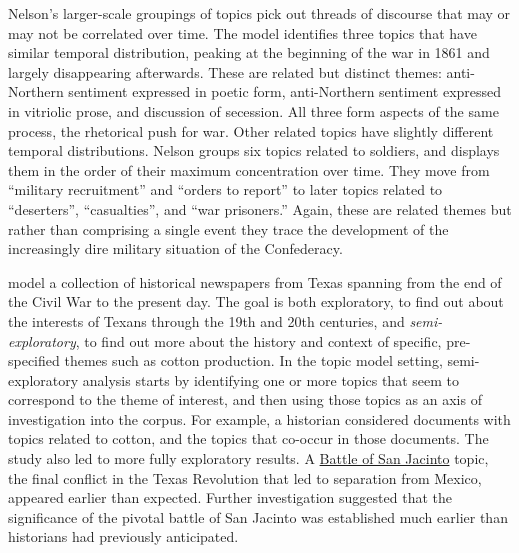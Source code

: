 Nelson's larger-scale groupings of topics pick out threads of discourse that may or may not be correlated over time.
The model identifies three topics that have similar temporal distribution, peaking at the beginning of the war in 1861 and largely disappearing afterwards.
These are related but distinct themes: anti-Northern sentiment expressed in poetic form, anti-Northern sentiment expressed in vitriolic prose, and discussion of secession.
All three form aspects of the same process, the rhetorical push for war.
Other related topics have slightly different temporal distributions.
Nelson groups six topics related to soldiers, and displays them in the order of their maximum concentration over time.
They move from ``military recruitment'' and ``orders to report'' to later topics related to ``deserters'', ``casualties'', and ``war prisoners.''
Again, these are related themes but rather than comprising a single event they trace the development of the increasingly dire military situation of the Confederacy.

\citet{yang-11-historical} model a collection of historical newspapers from Texas spanning from the end of the Civil War to the present day.
The goal is both exploratory, to find out about the interests of Texans through the 19th and 20th centuries, and {\em semi-exploratory}, to find out more about the history and context of specific, pre-specified themes such as cotton production.
In the topic model setting, semi-exploratory analysis starts by identifying one or more topics that seem to correspond to the theme of interest, and then using those topics as an axis of investigation into the corpus.
For example, a historian considered documents with topics related to cotton, and the topics that co-occur in those documents.
The study also led to more fully exploratory results.
A \underline{Battle of San Jacinto} topic, the final conflict in the Texas Revolution that led to separation from Mexico, appeared earlier than expected.
Further investigation suggested that the significance of the pivotal battle of San Jacinto was established much earlier than historians had previously anticipated.

